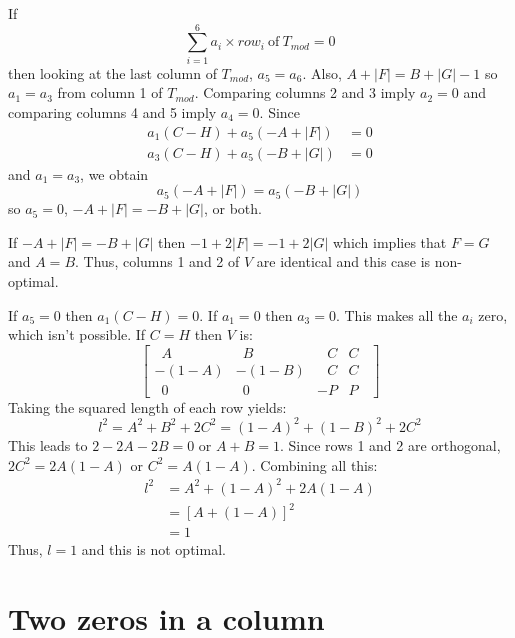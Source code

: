 If
\begin{equation*}
\sum_{i=1}^{6} a_i \times row_i~\text{of}~T_{mod} = 0
\end{equation*}
then looking at the last column of $T_{mod}$, $a_5 = a_6$.  Also,
$A+|F|=B+|G|-1$ so $a_1 = a_3$ from column 1 of $T_{mod}$.  Comparing columns
2 and 3 imply $a_2 = 0$ and comparing columns 4 and 5 imply $a_4 = 0$. Since
\begin{align*}
a_1 (C-H) + a_5 (-A+|F|) & = 0 \\
a_3 (C-H) + a_5 (-B+|G|) & = 0
\end{align*}
and $a_1 = a_3$, we obtain
\begin{equation*}
a_5 (-A+|F|) = a_5(-B+|G|)
\end{equation*}
so $a_5 = 0$, $-A+|F|=-B+|G|$, or both.

If $-A+|F|=-B+|G|$ then $-1+2|F|=-1+2|G|$ which implies that $F=G$ and $A=B$.
Thus, columns 1 and 2 of $V$ are identical and this case is non-optimal.

If $a_5 = 0$ then $a_1(C-H)=0$.  If $a_1 = 0$ then $a_3 = 0$.  This makes all
the $a_i$ zero, which isn't possible. If $C=H$ then $V$ is:
\begin{equation*}
\begin{bmatrix}
  ~\;A     &   ~\;B     & ~~\;C & C~\; \\
-(1\!-\!A) & -(1\!-\!B) & ~~\;C & C~\; \\
  ~\;0     &   ~\;0     &    -P & P~\;
\end{bmatrix}
\end{equation*}
Taking the squared length of each row yields:
\begin{equation*}
l^2 = A^2 + B^2 + 2 C^2 = (1-A)^2 + (1-B)^2 + 2 C^2
\end{equation*}
This leads to $2-2A-2B=0$ or $A+B=1$. Since rows 1 and 2 are orthogonal, $2
C^2 = 2A(1-A)$ or $C^2 = A(1-A)$.  Combining all this:
\begin{align*}
l^2 &= A^2 + (1-A)^2 + 2A(1-A) \\
    &= [A + (1-A)]^2           \\
    &= 1
\end{align*}
Thus, $l = 1$ and this is not optimal.

\section*{Two zeros in a column}

